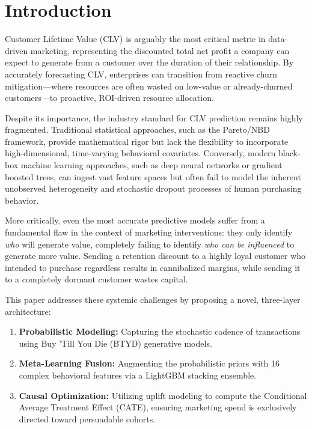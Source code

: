 \documentclass[10pt,conference]{IEEEtran}
\begin{document}
\section{Introduction}
Customer Lifetime Value (CLV) is arguably the most critical metric in data-driven marketing, representing the discounted total net profit a company can expect to generate from a customer over the duration of their relationship. By accurately forecasting CLV, enterprises can transition from reactive churn mitigation—where resources are often wasted on low-value or already-churned customers—to proactive, ROI-driven resource allocation.

Despite its importance, the industry standard for CLV prediction remains highly fragmented. Traditional statistical approaches, such as the Pareto/NBD framework, provide mathematical rigor but lack the flexibility to incorporate high-dimensional, time-varying behavioral covariates. Conversely, modern black-box machine learning approaches, such as deep neural networks or gradient boosted trees, can ingest vast feature spaces but often fail to model the inherent unobserved heterogeneity and stochastic dropout processes of human purchasing behavior.

More critically, even the most accurate predictive models suffer from a fundamental flaw in the context of marketing interventions: they only identify \textit{who} will generate value, completely failing to identify \textit{who can be influenced} to generate more value. Sending a retention discount to a highly loyal customer who intended to purchase regardless results in cannibalized margins, while sending it to a completely dormant customer wastes capital.

This paper addresses these systemic challenges by proposing a novel, three-layer architecture:
\begin{enumerate}
    \item \textbf{Probabilistic Modeling:} Capturing the stochastic cadence of transactions using Buy 'Till You Die (BTYD) generative models.
    \item \textbf{Meta-Learning Fusion:} Augmenting the probabilistic priors with 16 complex behavioral features via a LightGBM stacking ensemble.
    \item \textbf{Causal Optimization:} Utilizing uplift modeling to compute the Conditional Average Treatment Effect (CATE), ensuring marketing spend is exclusively directed toward persuadable cohorts.
\end{enumerate}
\end{document}
